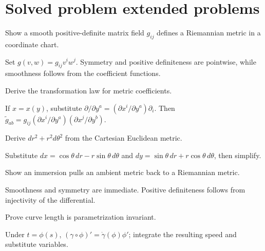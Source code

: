 \section{Solved problem extended problems}

\begin{problem}\label{prob:vii20-01}
Show a smooth positive-definite matrix field \(g_{ij}\) defines a Riemannian metric in a coordinate chart.
\end{problem}
\begin{solution}
Set \(g(v,w)=g_{ij}v^iw^j\). Symmetry and positive definiteness are pointwise, while smoothness follows from the coefficient functions.
\end{solution}

\begin{problem}\label{prob:vii20-02}
Derive the transformation law for metric coefficients.
\end{problem}
\begin{solution}
If \(x=x(y)\), substitute \(\partial/\partial y^a=(\partial x^i/\partial y^a)\partial_i\). Then \(\widetilde g_{ab}=g_{ij}(\partial x^i/\partial y^a)(\partial x^j/\partial y^b)\).
\end{solution}

\begin{problem}\label{prob:vii20-03}
Derive \(dr^2+r^2d\theta^2\) from the Cartesian Euclidean metric.
\end{problem}
\begin{solution}
Substitute \(dx=\cos\theta\,dr-r\sin\theta\,d\theta\) and \(dy=\sin\theta\,dr+r\cos\theta\,d\theta\), then simplify.
\end{solution}

\begin{problem}\label{prob:vii20-04}
Show an immersion pulls an ambient metric back to a Riemannian metric.
\end{problem}
\begin{solution}
Smoothness and symmetry are immediate. Positive definiteness follows from injectivity of the differential.
\end{solution}

\begin{problem}\label{prob:vii20-05}
Prove curve length is parametrization invariant.
\end{problem}
\begin{solution}
Under \(t=\phi(s)\), \((\gamma\circ\phi)'=\dot\gamma(\phi)\phi'\); integrate the resulting speed and substitute variables.
\end{solution}

